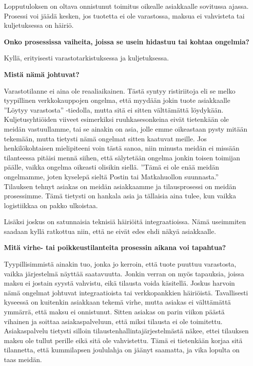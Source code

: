 \documentclass[
  finnish,
  letterpaper,
  DIV=11,
  numbers=noendperiod,
  oneside]{scrreprt}
\begin{document}
Lopputuloksen on oltava onnistunut toimitus oikealle asiakkaalle
sovitussa ajassa. Prosessi voi jäädä kesken, jos tuotetta ei ole
varastossa, maksua ei vahvisteta tai kuljetuksessa on häiriö.

\textbf{Onko prosessissa vaiheita, joissa se usein hidastuu tai kohtaa
ongelmia?}

Kyllä, erityisesti varastotarkistuksessa ja kuljetuksessa.

\textbf{Mistä nämä johtuvat?}

Varastotilanne ei aina ole reaaliaikainen. Tästä syntyy ristiriitoja eli
se melko tyypillinen verkkokauppojen ongelma, että myydään jokin tuote
asiakkaalle ''Löytyy varastosta'' -tiedolla, mutta sitä ei sitten
välttämättä löydykään. Kuljetusyhtiöiden viiveet esimerkiksi
ruuhkasesonkeina eivät tietenkään ole meidän vastuullamme, tai se
ainakin on asia, jolle emme oikeastaan pysty mitään tekemään, mutta
tietysti nämä ongelmat sitten kaatuvat meille. Jos henkilökohtaisen
mielipiteeni voin tästä sanoa, niin minusta meidän ei missään
tilanteessa pitäisi mennä siihen, että sälytetään ongelma jonkin toisen
toimijan päälle, vaikka ongelma oikeasti olisikin siellä. ''Tämä ei ole
enää meidän ongelmamme, joten kyselepä sieltä Postin tai Matkahuollon
suunnasta.'' Tilauksen tehnyt asiakas on meidän asiakkaamme ja
tilausprosessi on meidän prosessimme. Tämä tietysti on hankala asia ja
tällaisia aina tulee, kun vaikka logistiikkaa on pakko ulkoistaa.

Lisäksi joskus on satunnaisia teknisiä häiriöitä integraatioissa. Nämä
useimmiten saadaan kyllä ratkottua niin, että ne eivät edes ehdi näkyä
asiakkaalle.

\textbf{Mitä virhe- tai poikkeustilanteita prosessin aikana voi
tapahtua?}

Tyypillisimmistä ainakin tuo, jonka jo kerroin, että tuote puuttuu
varastosta, vaikka järjestelmä näyttää saatavuutta. Jonkin verran on
myös tapauksia, joissa maksu ei jostain syystä vahvistu, eikä tilausta
voida käsitellä. Joskus harvoin nämä ongelmat johtuvat integraatioista
tai verkkopankkien häiriöistä. Tavallisesti kyseessä on kuitenkin
asiakkaan tekemä virhe, mutta asiakas ei välttämättä ymmärrä, että maksu
ei onnistunut. Sitten asiakas on parin viikon päästä vihainen ja soittaa
asiakaspalveluun, että miksi tilausta ei ole toimitettu. Asiakaspalvelu
tietysti silloin tilaustenhallintajärjestelmästä näkee, ettei tilauksen
maksu ole tullut perille eikä sitä ole vahvistettu. Tämä ei tietenkään
korjaa sitä tilannetta, että kummilapsen joululahja on jäänyt saamatta,
ja vika lopulta on taas meidän.
\end{document}
